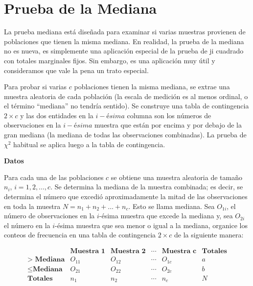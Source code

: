 \documentclass[
  a4paper,
  oneside,
  openany]{book}
\begin{document}
\hypertarget{prueba-de-la-mediana}{%
\chapter{Prueba de la Mediana}\label{prueba-de-la-mediana}}

La prueba mediana está diseñada para examinar si varias muestras provienen de poblaciones que tienen la misma mediana. En realidad, la prueba de la mediana no es nueva, es simplemente una aplicación especial de la prueba de ji cuadrado con totales marginales fijos. Sin embargo, es una aplicación muy útil y consideramos que vale la pena un trato especial.

Para probar si varias \(c\) poblaciones tienen la misma mediana, se extrae una muestra aleatoria de cada población (la escala de medición es al menos ordinal, o el término ``mediana'' no tendría sentido). Se construye una tabla de contingencia \(2\times c\) y las dos entidades en la \(i-ésima\) columna son los números de observaciones en la \(i-ésima\) muestra que están por encima y por debajo de la gran mediana (la mediana de todas las observaciones combinadas). La prueba de \(\chi^2\) habitual se aplica luego a la tabla de contingencia.

\textbf{Datos}

Para cada una de las poblaciones \(c\) se obtiene una muestra aleatoria de tamaño \(n_{i}\), \(i = 1,2,\ldots, c\). Se determina la mediana de la muestra combinada; es decir, se determina el número que excedió aproximadamente la mitad de las observaciones en toda la muestra \(N = n_{1} + n_{2}+ \ldots + n_{c}\). Esto se llama mediana. Sea \(O_{1i}\), el número de observaciones en la \(i\)-ésima muestra que excede la mediana y, sea \(O_{2i}\) el número en la \(i\)-ésima muestra que sea menor o igual a la mediana, organice los conteos de frecuencia en una tabla de contingencia \(2\times c\) de la siguiente manera:

\[
\begin{array}{c|c|c|c|c|c}
 & \textbf{Muestra 1}  & \textbf{Muestra 2}    & \cdots & \textbf{Muestra c} &\textbf{Totales}     \\
\hline
\textbf{> Mediana} & O_{11} & O_{12} & \cdots & O_{1c} & a   \\
\hline
\leq \textbf{Mediana} & O_{21} & O_{22} & \cdots & O_{2c} & b\\
\hline
\textbf{Totales}    & n_{1}  & n_{2}  & \cdots & n_{c}  & N \\
\end{array}
\]
\end{document}
